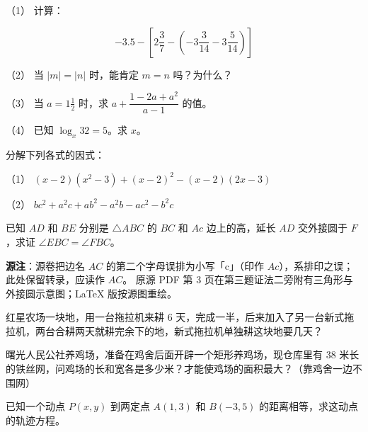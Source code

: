 \begin{question}

（1） 计算：

\nopagebreak[4]
\[
-3.5-\left[2\frac{3}{7}-\left(-3\frac{3}{14}-3\frac{5}{14}\right)\right]
\]

（2） 当 $|m|=|n|$ 时，能肯定 $m=n$ 吗？为什么？

（3） 当 $a=1\frac{1}{2}$ 时，求 $a+\dfrac{1-2a+a^2}{a-1}$ 的值。

（4） 已知 $\log_x32=5$。求 $x$。

\end{question}
\begin{question}
分解下列各式的因式：

（1） $(x-2)(x^2-3)+(x-2)^2-(x-2)(2x-3)$

（2） $bc^2+a^2c+ab^2-a^2b-ac^2-b^2c$

\Needspace{0.4\textheight}
\end{question}
\begin{question}
已知 $AD$ 和 $BE$ 分别是 $\triangle ABC$ 的 $BC$ 和 $Ac$ 边上的高，延长 $AD$ 交外接圆于 $F$，求证 $\angle EBC=\angle FBC$。

\begin{gktip}
\textbf{源注}：源卷把边名 $AC$ 的第二个字母误排为小写「c」（印作 $Ac$），系排印之误；此处保留转录，应读作 $AC$。
原源 PDF 第 3 页在第三题证法二旁附有三角形与外接圆示意图；LaTeX 版按源图重绘。
\end{gktip}
\nopagebreak[4]
\begin{center}\end{center}
\nopagebreak[4]
\end{question}
\begin{question}
红星农场一块地，用一台拖拉机来耕 $6$ 天，完成一半，后来加入了另一台新式拖拉机，两台合耕两天就耕完余下的地，新式拖拉机单独耕这块地要几天？

\end{question}
\begin{question}
曙光人民公社养鸡场，准备在鸡舍后面开辟一个矩形养鸡场，现仓库里有 $38$ 米长的铁丝网，问鸡场的长和宽各是多少米？才能使鸡场的面积最大？（靠鸡舍一边不围网）

\end{question}
\begin{question}
已知一个动点 $P(x,y)$ 到两定点 $A(1,3)$ 和 $B(-3,5)$ 的距离相等，求这动点的轨迹方程。

\end{question}